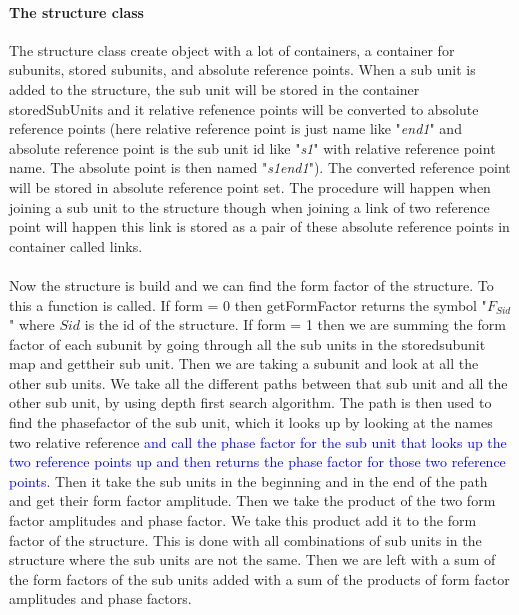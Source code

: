     \paragraph{The structure class} The structure class create object with a lot of containers, a container for subunits, stored subunits, and absolute reference points. When a sub unit is added to the structure, the sub unit will be stored in the container storedSubUnits and it relative refenence points will be converted to absolute reference points (here relative reference point is just name like "\textit{end1}" and absolute reference point is the sub unit id like "\textit{s1}" with relative reference point name. The absolute point is then named "\textit{s1end1}"). The converted reference point will be stored in absolute reference point set. The procedure will happen when joining a sub unit to the structure though when joining a link of two reference point will happen this link is stored as a pair of these absolute reference points in container called links.
    \\\\Now the structure is build and we can find the form factor of the structure. To this a function  is called. If form = 0 then getFormFactor returns the symbol "$F_{Sid}$" where $Sid$ is the id of the structure. If form = 1 then we are summing the form factor of each subunit by going through all the sub units in the storedsubunit map and gettheir sub unit. Then we are taking a subunit and look at all the other sub units. We take all the different paths between that sub unit and all the other sub unit, by using depth first search algorithm. The path is then used to find the phasefactor of the sub unit, which it looks up by looking at the names two relative reference \textcolor{blue}{and call the phase factor for the sub unit that looks up the two reference points up and then returns the phase factor for those two reference points}. Then it take the sub units in the beginning and in the end of the path and get their form factor amplitude. Then we take the product of the two form factor amplitudes and phase factor. We take this product add it to the form factor of the structure. This is done with all combinations of sub units in the structure where the sub units are not the same. Then we are left with a sum of the form factors of the sub units added with a sum of the products of form factor amplitudes and phase factors. 
